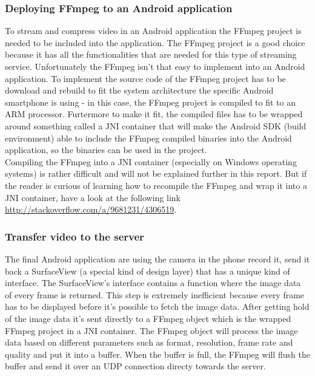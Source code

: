 \subsubsection{Deploying FFmpeg to an Android application}
To stream and compress video in an Android application the FFmpeg project is needed to be included into the application. The FFmpeg project is a good choice because it has all the functionalities that are needed for this type of streaming service. Unfortunately the FFmpeg isn't that easy to implement into an Android application. To implement the source code of the FFmpeg project has to be download and rebuild to fit the system architecture the specific Android smartphone is using - in this case, the FFmpeg project is compiled to fit to an ARM processor. Furtermore to make it fit, the compiled files has to be wrapped around something called a JNI container that will make the Android SDK (build environment) able to include the FFmpeg compiled binaries into the Android application, so the binaries can be used in the project.\\

Compiling the FFmpeg into a JNI container (especially on Windows operating systems) is rather difficult and will not be explained further in this report. But if the reader is curious of learning how to recompile the FFmpeg and wrap it into a JNI container, have a look at the following link \href{http://stackoverflow.com/a/9681231/4306519}{http://stackoverflow.com/a/9681231/4306519}.

\subsubsection{Transfer video to the server}
The final Android application are using the camera in the phone record it, send it back a SurfaceView (a special kind of design layer) that has a unique kind of interface. The SurfaceView's interface contains a function where the image data of every frame is returned. This step is extremely inefficient because every frame has to be displayed before it's possible to fetch the image data. After getting hold of the  image data it's sent directly to a FFmpeg object which is the wrapped FFmpeg project in a JNI container. The FFmpeg object will process the image data based on different parameters such as format, resolution, frame rate and quality and put it into a buffer. When the buffer is full, the FFmpeg will flush the buffer and send it over an UDP connection directy towards the server.\\

